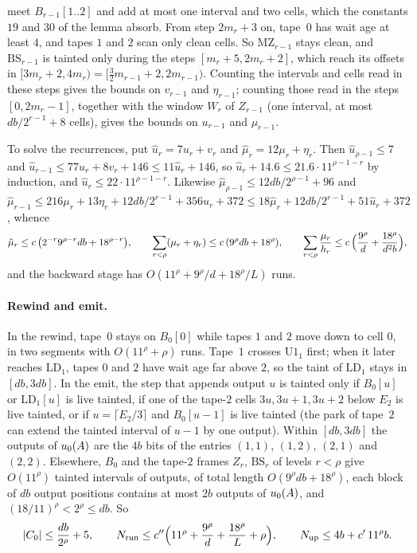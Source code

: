 \begin{informalproof}
\begin{enumerate}[label=(\arabic*)]
meet $B_{r-1}[1..2]$ and add at most one interval and two cells, which the constants $19$ and $30$ of the lemma absorb. From step $2m_r+3$ on, tape~$0$ has wait age at least $4$, and tapes $1$ and $2$ scan only clean cells. So $\mathrm{MZ}_{r-1}$
stays clean, and $\mathrm{BS}_{r-1}$ is tainted only during the steps $[m_r+5,2m_r+2]$, which reach its offsets in
$[3m_r+2,4m_r)=[\frac32m_{r-1}+2,2m_{r-1})$. Counting the intervals and cells read in these steps gives the bounds on $v_{r-1}$ and
$\eta_{r-1}$; counting those read in the steps $[0,2m_r-1]$, together with the window $W_r$ of $Z_{r-1}$ (one interval, at most
$db/2^{r-1}+8$ cells), gives the bounds on $u_{r-1}$ and $\mu_{r-1}$.\qedhere
\end{enumerate}
\end{informalproof}

To solve the recurrences, put $\hat u_r=7u_r+v_r$ and $\hat\mu_r=12\mu_r+\eta_r$. Then $\hat u_{\rho-1}\le7$ and
$\hat u_{r-1}\le77u_r+8v_r+146\le11\hat u_r+146$, so $\hat u_r+14.6\le21.6\cdot11^{\rho-1-r}$ by induction, and
$\hat u_r\le22\cdot11^{\rho-1-r}$. Likewise $\hat\mu_{\rho-1}\le12db/2^{\rho-1}+96$ and
$\hat\mu_{r-1}\le216\mu_r+13\eta_r+12db/2^{r-1}+356u_r+372\le18\hat\mu_r+12db/2^{r-1}+51\hat u_r+372$, whence
\[
  \hat\mu_r\le c\,\bigl(2^{-r}9^{\rho-r}db+18^{\rho-r}\bigr),\qquad \sum_{r<\rho}(\mu_r+\eta_r)\le c\,(9^\rho db+18^\rho),\qquad
  \sum_{r<\rho}\frac{\mu_r}{h_r}\le c\,\Bigl(\frac{9^\rho}d+\frac{18^\rho}{d^2b}\Bigr),
\]
and the backward stage has $O(11^\rho+9^\rho/d+18^\rho/L)$ runs.

\paragraph{Rewind and emit.} In the rewind, tape~$0$ stays on $B_0[0]$ while tapes $1$ and $2$ move down to cell $0$, in two segments
with $O(11^\rho+\rho)$ runs. Tape~$1$ crosses $\mathrm{U1}_1$ first; when it later reaches $\mathrm{LD}_1$, tapes $0$ and $2$ have wait age
far above $2$, so the taint of $\mathrm{LD}_1$ stays in $[db,3db]$. In the emit, the step that appends output $u$ is tainted only if
$B_0[u]$ or $\mathrm{LD}_1[u]$ is live tainted, if one of the tape-$2$ cells $3u,3u+1,3u+2$ below $E_2$ is live tainted, or if
$u=\lceil E_2/3\rceil$ and $B_0[u-1]$ is live tainted (the park of tape~$2$ can extend the tainted interval of $u-1$ by one output).
Within $[db,3db]$ the outputs of $u_0(A)$ are the $4b$ bits of the entries $(1,1)$, $(1,2)$, $(2,1)$ and $(2,2)$. Elsewhere, $B_0$ and the
tape-$2$ frames $Z_r$, $\mathrm{BS}_r$ of levels $r<\rho$ give $O(11^\rho)$ tainted intervals of outputs, of total length
$O(9^\rho db+18^\rho)$, each block of $db$ output positions contains at most $2b$ outputs of $u_0(A)$, and $(18/11)^\rho<2^\rho\le db$.
So
\begin{equation}\label{eq:c4-total}
  \lvert C_0 \rvert\le\frac{db}{2^\rho}+5,\qquad N_{\mathrm{run}}\le c''\Bigl(11^\rho+\frac{9^\rho}d+\frac{18^\rho}L+\rho\Bigr),\qquad
  N_{\mathrm{up}}\le4b+c'\,11^\rho b .
\end{equation}


